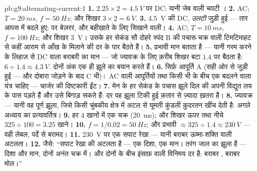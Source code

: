 \begin{solution}{pb:g9:alternating-current:1}
\textbf{1.} $2.25 \times 2 = \qty{4.5}{V}$ पर DC: यानी जेब वाली चपटी
।
\textbf{2.} AC; $T = \qty{20}{ms}$, $f = \qty{50}{Hz}$; और शिखर
$3 \times 2 = \qty{6}{V}$.
\textbf{3.} \qty{4.5}{V} की DC, \emph{उलटी} जुड़ी हुई --- तार
आपस में बदले हुए:  पर बेज़रर, और बहीखाते के लिए सिखाने वाली।
\textbf{4.} AC; $T = \qty{10}{ms}$, $f = \qty{100}{Hz}$; और शिखर
\qty{3}{V}। उसके हर सेकंड सौ दोहरे स्पंद B की पचास-चक्र वाली टिमटिमाहट
से कहीं आराम से आँख के मिलाने की दर के पार बैठते हैं।
\textbf{5.}  प्रभावी मान बताता है --- यानी गरम करने के लिहाज़
से DC वाला बराबरी का मान --- जो ज्यावक्र के लिए क़रीब शिखर बटा $1.4$
पर बैठता है: $6 \div 1.4 \approx \qty{4.3}{V}$. दोनों अंक एक ही झूले
का बयान करते हैं।
\textbf{6.} सिर्फ़ आपूर्ति A (सही ओर से जुड़ी हुई --- और दोबारा जोड़ने
के बाद C भी)। AC वाली आपूर्तियों तथा किसी भी  के बीच एक बदलने
वाला यंत्र चाहिए --- चार्जर की दिष्टकारी ईंट।
\textbf{7.} मेन के हर सेकंड के पचास झूले दिल की अपनी विद्युत लय के पास
पड़ते हैं और उसे बिगाड़ सकते हैं:  दर  वह झूला टिकी हुई
क़तार से ज़्यादा ख़तरा है।
\textbf{8.} ज्यावक्र --- यानी वह पूर्ण झूला, जिसे किसी चुंबकीय क्षेत्र
में अटल  से घूमती कुंडली क़ुदरतन खींच देती है: अगले अध्याय का
प्रत्यावर्तित्र।
\textbf{9.} हर $4$ खानों में एक चक्र (\qty{20}{ms}); और शिखर ऊपर तथा
नीचे $325 \div 100 = 3.25$ खाने।
\textbf{10.} $f = 1/0.02 = \qty{50}{Hz}$; और प्रभावी $\approx 325
\div 1.4 \approx \qty{230}{V}$ --- वही लेबल, पर्दे से बरामद।
\textbf{11.} \qty{230}{V} पर एक सपाट रेखा --- यानी बराबर ऊष्मा-शक्ति
वाली अटलता।
\textbf{12.} जैसे: ``सपाट रेखा  की अटलता है --- एक दिशा, एक मान।
तरंग जाल का झूला है --- दिशा और मान, दोनों अनंत चक्र में। और दोनों के
बीच इंसाफ़ वाली विनिमय दर  है: बराबर , बराबर
मोल।''
\end{solution}
